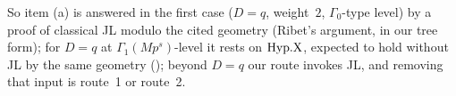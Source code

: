 So item (a) is answered in the first case ($D=q$, weight~$2$, $\Gamma_0$-type level) by a proof of classical JL modulo the cited
geometry (Ribet's argument, in our tree form); for $D=q$ at $\Gamma_1(Mp^s)$-level it rests on $\mathrm{Hyp.X}$, expected to hold
without JL by the same geometry (\stexp); beyond $D=q$ our route invokes JL, and removing that input is route~1 or route~2.

